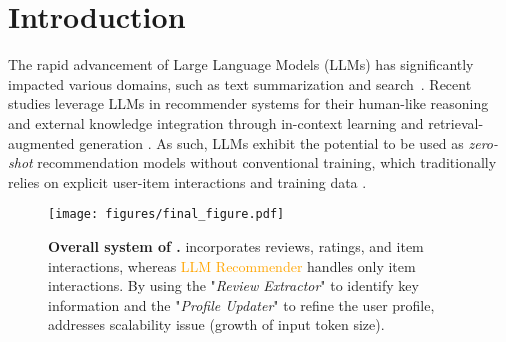 \section{Introduction} 

The rapid advancement of Large Language Models (LLMs) \cite{touvron2023llama, dubey2024llama, achiam2023gpt, team2024gemma} has significantly impacted various domains, such as text summarization \cite{lewis2019bart} and search~\cite{karpukhin2020dense}. Recent studies leverage LLMs in recommender systems for their human-like reasoning and external knowledge integration through in-context learning \cite{brown2020language} and retrieval-augmented generation \cite{lewis2020retrieval}. As such, LLMs exhibit the potential to be used as \emph{zero-shot} recommendation models without conventional training, which traditionally relies on explicit user-item interactions and training data \cite{he2017neural, kang2018self, he2020lightgcn}. 




\begin{figure*}[t]
\centering
\begin{minipage}{0.98\linewidth}
\centering
\texttt{[image: figures/final\_figure.pdf]}
\vspace*{-2em}
\caption{\textbf{Overall system of \myalg.} \textcolor{Blue}{\myalg{}} incorporates reviews, ratings, and item interactions, whereas \textcolor{Orange}{LLM Recommender} handles only item interactions. By using the "\textit{Review Extractor}" to identify key information and the "\textit{Profile Updater}" to refine the user profile, \myalg{} addresses scalability issue (\ie growth of input token size).}
\label{fig:intro}
\end{minipage}
\vspace*{-1em}
\end{figure*}

